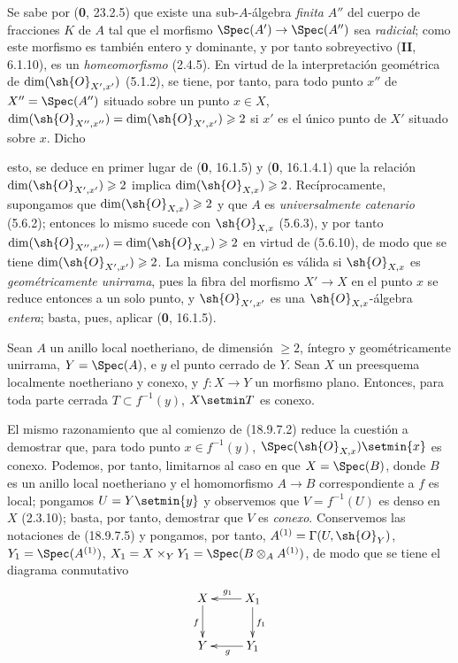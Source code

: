 \begin{remark}[18.9.7.6]
\label{IV.18.9.7.6}
Se sabe por (\textbf 0, 23.2.5) que existe una sub-$A$-álgebra \emph{finita} $A''$ del cuerpo de fracciones $K$ de $A$ tal que el morfismo $\Spec(A')\to\Spec(A'')$ sea \emph{radicial}; como este morfismo es también entero y dominante, y por tanto sobreyectivo (\textbf{II}, 6.1.10), es un \emph{homeomorfismo} (2.4.5). En virtud de la interpretación geométrica de $\dim(\sh{O}_{X',x'})$ (5.1.2), se tiene, por tanto, para todo punto $x''$ de $X''=\Spec(A'')$ situado sobre un punto $x\in X$, $\dim(\sh{O}_{X'',x''})=\dim(\sh{O}_{X',x'})\geq 2$ si $x'$ es el único punto de $X'$ situado sobre $x$. Dicho


esto, se deduce en primer lugar de (\textbf 0, 16.1.5) y (\textbf 0, 16.1.4.1) que la relación $\dim(\sh{O}_{X',x'})\geq 2$ implica $\dim(\sh{O}_{X,x})\geq 2$. Recíprocamente, supongamos que $\dim(\sh{O}_{X,x})\geq 2$ y que $A$ es \emph{universalmente catenario} (5.6.2); entonces lo mismo sucede con $\sh{O}_{X,x}$ (5.6.3), y por tanto $\dim(\sh{O}_{X'',x''})=\dim(\sh{O}_{X,x})\geq 2$ en virtud de (5.6.10), de modo que se tiene $\dim(\sh{O}_{X',x'})\geq 2$. La misma conclusión es válida si $\sh{O}_{X,x}$ es \emph{geométricamente unirrama}, pues la fibra del morfismo $X'\to X$ en el punto $x$ se reduce entonces a un solo punto, y $\sh{O}_{X',x'}$ es una $\sh{O}_{X,x}$-álgebra \emph{entera}; basta, pues, aplicar (\textbf 0, 16.1.5).
\end{remark}

\begin{lemma}[18.9.7.7]
\label{IV.18.9.7.7}
Sean $A$ un anillo local noetheriano, de dimensión $\geq 2$, íntegro y geométricamente unirrama, $Y=\Spec(A)$, e $y$ el punto cerrado de $Y$. Sean $X$ un preesquema localmente noetheriano y conexo, y $f:X\to Y$ un morfismo plano. Entonces, para toda parte cerrada $T\subset f^{-1}(y)$, $X\setmin T$ es conexo.
\end{lemma}

El mismo razonamiento que al comienzo de (18.9.7.2) reduce la cuestión a demostrar que, para todo punto $x\in f^{-1}(y)$, $\Spec(\sh{O}_{X,x})\setmin\{x\}$ es conexo. Podemos, por tanto, limitarnos al caso en que $X=\Spec(B)$, donde $B$ es un anillo local noetheriano y el homomorfismo $A\to B$ correspondiente a $f$ es local; pongamos $U=Y\setmin\{y\}$ y observemos que $V=f^{-1}(U)$ es denso en $X$ (2.3.10); basta, por tanto, demostrar que $V$ es \emph{conexo}. Conservemos las notaciones de (18.9.7.5) y pongamos, por tanto, $A^{(1)}=\Gamma(U,\sh{O}_Y)$, $Y_1=\Spec(A^{(1)})$, $X_1=X\times_Y Y_1=\Spec(B\otimes_A A^{(1)})$, de modo que se tiene el diagrama conmutativo
\[
  \xymatrix{
    X \ar[d]_{f} & X_1 \ar[l]_{g_1} \ar[d]^{f_1} \\
    Y & Y_1 \ar[l]^{g}
  }
\]


